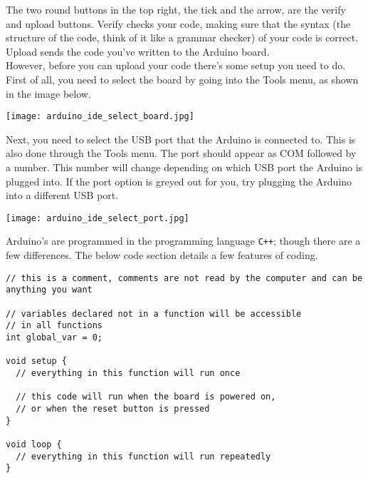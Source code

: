 \documentclass[../TinyBot.tex]{subfiles}
\begin{document}
The two round buttons in the top right, the tick and the arrow, are the verify and upload buttons. Verify checks your code, making sure that the syntax (the structure of the code, think of it like a grammar checker) of your code is correct. Upload sends the code you've written to the Arduino board.  \\

However, before you can upload your code there's some setup you need to do. First of all, you need to select the board by going into the Tools menu, as shown in the image below. 

\begin{center}
  \texttt{[image: arduino\_ide\_select\_board.jpg]}
\end{center}

Next, you need to select the USB port that the Arduino is connected to. This is also done through the Tools menu. The port should appear as COM followed by a number. This number will change depending on which USB port the Arduino is plugged into. If the port option is greyed out for you, try plugging the Arduino into a different USB port. 
\begin{center}
  \texttt{[image: arduino\_ide\_select\_port.jpg]}
\end{center}

\bigskip










Arduino's are programmed in the programming language \lstinline[]!C++!; though there are a few differences. The below code section details a few features of coding.


\begin{lstlisting}
// this is a comment, comments are not read by the computer and can be anything you want

// variables declared not in a function will be accessible
// in all functions
int global_var = 0;

void setup {
  // everything in this function will run once

  // this code will run when the board is powered on,
  // or when the reset button is pressed
}

void loop {
  // everything in this function will run repeatedly
}

\end{lstlisting}
\bigskip
\end{document}
